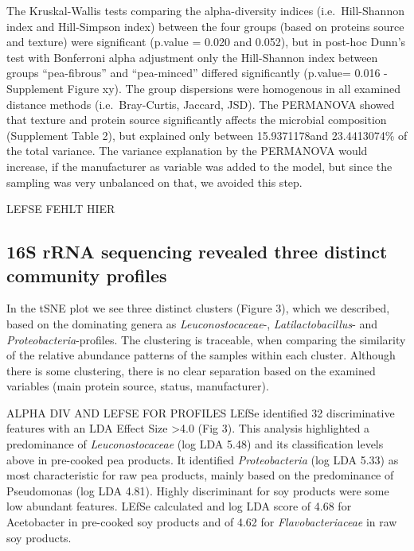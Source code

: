 \documentclass[preprint, 3p,
authoryear]{elsarticle} %
\begin{document}
The Kruskal-Wallis tests comparing the alpha-diversity indices
(i.e.~Hill-Shannon index and Hill-Simpson index) between the four groups
(based on proteins source and texture) were significant (p.value = 0.020
and 0.052), but in post-hoc Dunn's test with Bonferroni alpha adjustment
only the Hill-Shannon index between groups ``pea-fibrous'' and
``pea-minced'' differed significantly (p.value= 0.016 - Supplement
Figure xy). The group dispersions were homogenous in all examined
distance methods (i.e.~Bray-Curtis, Jaccard, JSD). The PERMANOVA showed
that texture and protein source significantly affects the microbial
composition (Supplement Table 2), but explained only between
15.9371178and 23.4413074\% of the total variance. The variance
explanation by the PERMANOVA would increase, if the manufacturer as
variable was added to the model, but since the sampling was very
unbalanced on that, we avoided this step.

LEFSE FEHLT HIER

\hypertarget{s-rrna-sequencing-revealed-three-distinct-community-profiles}{%
\subsection{16S rRNA sequencing revealed three distinct community
profiles}\label{s-rrna-sequencing-revealed-three-distinct-community-profiles}}

In the tSNE plot we see three distinct clusters (Figure 3), which we
described, based on the dominating genera as \emph{Leuconostocaceae}-,
\emph{Latilactobacillus}- and \emph{Proteobacteria}-profiles. The
clustering is traceable, when comparing the similarity of the relative
abundance patterns of the samples within each cluster. Although there is
some clustering, there is no clear separation based on the examined
variables (main protein source, status, manufacturer).

ALPHA DIV AND LEFSE FOR PROFILES LEfSe identified 32 discriminative
features with an LDA Effect Size \textgreater4.0 (Fig 3). This analysis
highlighted a predominance of \emph{Leuconostocaceae} (log LDA 5.48) and
its classification levels above in pre-cooked pea products. It
identified \emph{Proteobacteria} (log LDA 5.33) as most characteristic
for raw pea products, mainly based on the predominance of Pseudomonas
(log LDA 4.81). Highly discriminant for soy products were some low
abundant features. LEfSe calculated and log LDA score of 4.68 for
Acetobacter in pre-cooked soy products and of 4.62 for
\emph{Flavobacteriaceae} in raw soy products.
\end{document}
